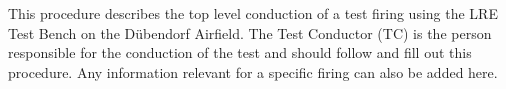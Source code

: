 This procedure describes the top level conduction of a test firing using the LRE Test Bench on the Dübendorf Airfield. The Test Conductor (TC) is the person responsible for the conduction of the test and should follow and fill out this procedure.
Any information relevant for a specific firing can also be added here.
